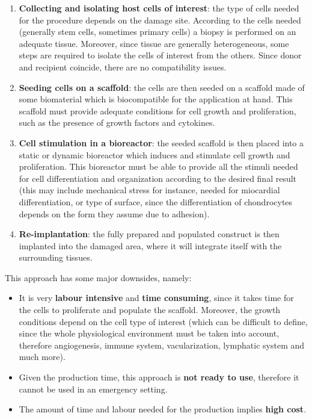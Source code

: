   \begin{multicols}{2}
    \begin{enumerate}
      \item \textbf{Collecting and isolating host cells of interest}: the type of cells needed for the procedure depends on the damage site.
        According to the cells needed (generally stem cells, sometimes primary cells) a biopsy is performed on an adequate tissue.
        Moreover, since tissue are generally heterogeneous, some steps are required to isolate the cells of interest from the others.
        Since donor and recipient coincide, there are no compatibility issues.
      \item \textbf{Seeding cells on a scaffold}: the cells are then seeded on a scaffold made of some biomaterial which is biocompatible for the application at hand.
        This scaffold must provide adequate conditions for cell growth and proliferation, such as the presence of growth factors and cytokines.
      \item \textbf{Cell stimulation in a bioreactor}: the seeded scaffold is then placed into a static or dynamic bioreactor which induces and stimulate cell growth and proliferation.
        This bioreactor must be able to provide all the stimuli needed for cell differentiation and organization according to the desired final result (this may include mechanical stress for instance, needed for miocardial differentiation, or type of surface, since the differentiation of chondrocytes depends on the form they assume due to adhesion).
      \item \textbf{Re-implantation}: the fully prepared and populated construct is then implanted into the damaged area, where it will integrate itself with the surrounding tissues.
    \end{enumerate}
  \end{multicols}

  This approach has some major downsides, namely:

  \begin{multicols}{2}
    \begin{itemize}
      \item It is very \textbf{labour intensive} and \textbf{time consuming}, since it takes time for the cells to proliferate and populate the scaffold.
        Moreover, the growth conditions depend on the cell type of interest (which can be difficult to define, since the whole physiological environment must be taken into account, therefore angiogenesis, immune system, vacularization, lymphatic system and much more).
      \item Given the production time, this approach is \textbf{not ready to use}, therefore it cannot be used in an emergency setting.
      \item The amount of time and labour needed for the production implies \textbf{high cost}.
    \end{itemize}
  \end{multicols}

